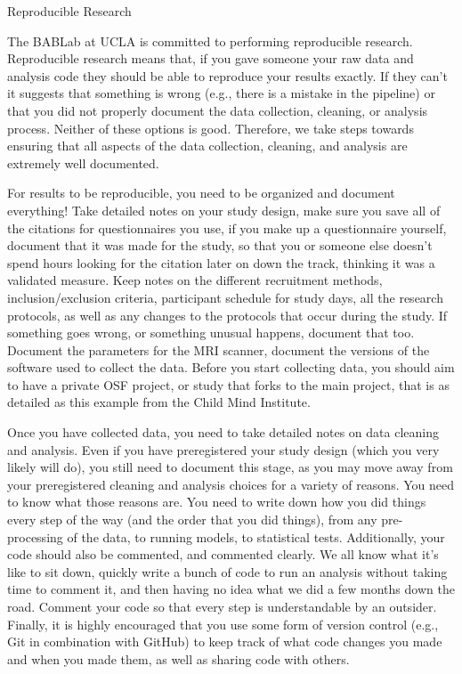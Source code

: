 \documentclass[]{book}
\begin{document}
Reproducible Research

The BABLab at UCLA is committed to performing reproducible research. Reproducible research means that, if you gave someone your raw data and analysis code they should be able to reproduce your results exactly. If they can't it suggests that something is wrong (e.g., there is a mistake in the pipeline) or that you did not properly document the data collection, cleaning, or analysis process. Neither of these options is good. Therefore, we take steps towards ensuring that all aspects of the data collection, cleaning, and analysis are extremely well documented.

For results to be reproducible, you need to be organized and document everything! Take detailed notes on your study design, make sure you save all of the citations for questionnaires you use, if you make up a questionnaire yourself, document that it was made for the study, so that you or someone else doesn't spend hours looking for the citation later on down the track, thinking it was a validated measure. Keep notes on the different recruitment methods, inclusion/exclusion criteria, participant schedule for study days, all the research protocols, as well as any changes to the protocols that occur during the study. If something goes wrong, or something unusual happens, document that too. Document the parameters for the MRI scanner, document the versions of the software used to collect the data. Before you start collecting data, you should aim to have a private OSF project, or study that forks to the main project, that is as detailed as this example from the Child Mind Institute.

Once you have collected data, you need to take detailed notes on data cleaning and analysis. Even if you have preregistered your study design (which you very likely will do), you still need to document this stage, as you may move away from your preregistered cleaning and analysis choices for a variety of reasons. You need to know what those reasons are. You need to write down how you did things every step of the way (and the order that you did things), from any pre-processing of the data, to running models, to statistical tests. Additionally, your code should also be commented, and commented clearly. We all know what it's like to sit down, quickly write a bunch of code to run an analysis without taking time to comment it, and then having no idea what we did a few months down the road. Comment your code so that every step is understandable by an outsider. Finally, it is highly encouraged that you use some form of version control (e.g., Git in combination with GitHub) to keep track of what code changes you made and when you made them, as well as sharing code with others.
\end{document}
